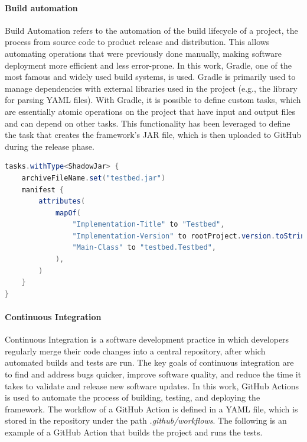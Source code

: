 \documentclass[12pt,a4paper,openright,twoside]{book}
\begin{document}
\paragraph*{Build automation}
Build Automation refers to the automation of the build lifecycle of a project, the process from source code to product release and distribution. 
This allows automating operations that were previously done manually, making software deployment more efficient and less error-prone.
In this work, Gradle, one of the most famous and widely used build systems, is used. 
Gradle is primarily used to manage dependencies with external libraries used in the project (e.g., the library for parsing YAML files).
With Gradle, it is possible to define custom tasks, which are essentially atomic operations on the project that have input and output files and can depend on other tasks. 
This functionality has been leveraged to define the task that creates the framework's JAR file, which is then uploaded to GitHub during the release phase.

\begin{lstlisting}[language=Java]
  tasks.withType<ShadowJar> {
    archiveFileName.set("testbed.jar")
    manifest {
        attributes(
            mapOf(
                "Implementation-Title" to "Testbed",
                "Implementation-Version" to rootProject.version.toString(),
                "Main-Class" to "testbed.Testbed",
            ),
        )
    }
}
\end{lstlisting}

\paragraph*{Continuous Integration}
Continuous Integration is a software development practice in which developers regularly merge their code changes into a central repository, after which automated builds and tests are run.
The key goals of continuous integration are to find and address bugs quicker, improve software quality, and reduce the time it takes to validate and release new software updates.
In this work, GitHub Actions is used to automate the process of building, testing, and deploying the framework.
The workflow of a GitHub Action is defined in a YAML file, which is stored in the repository under the path \textit{.github/workflows}.
The following is an example of a GitHub Action that builds the project and runs the tests.
\end{document}
